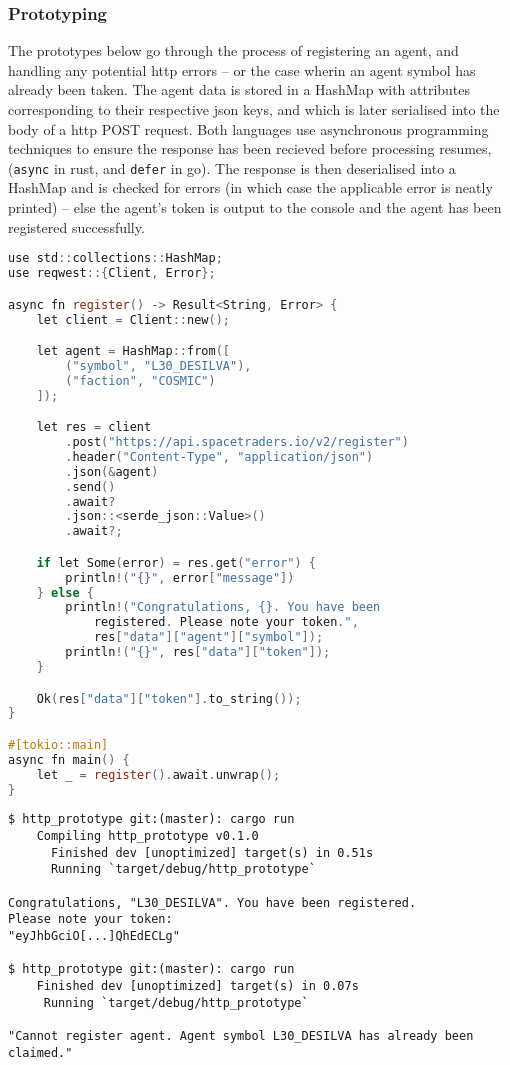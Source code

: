 \subsubsection{Prototyping}
The prototypes below go through the process of registering an agent, and handling any potential http errors – or the case wherin an agent symbol has already been taken. The agent data is stored in a HashMap with attributes corresponding to their respective json keys, and which is later serialised into the body of a http POST request. Both languages use asynchronous programming techniques to ensure the response has been recieved before processing resumes, (\texttt{async} in rust, and \texttt{defer} in go). The response is then deserialised into a HashMap and is checked for errors (in which case the applicable error is neatly printed) – else the agent's token is output to the console and the agent has been registered successfully.
\begin{lstlisting}[language=C]
use std::collections::HashMap;
use reqwest::{Client, Error};

async fn register() -> Result<String, Error> {
    let client = Client::new();

    let agent = HashMap::from([
        ("symbol", "L30_DESILVA"), 
        ("faction", "COSMIC")
    ]);

    let res = client
        .post("https://api.spacetraders.io/v2/register")
        .header("Content-Type", "application/json")
        .json(&agent)
        .send()
        .await?
        .json::<serde_json::Value>()
        .await?;

    if let Some(error) = res.get("error") {
        println!("{}", error["message"])
    } else {
        println!("Congratulations, {}. You have been 
            registered. Please note your token.", 
            res["data"]["agent"]["symbol"]);
        println!("{}", res["data"]["token"]);
    }

    Ok(res["data"]["token"].to_string());
}

#[tokio::main]
async fn main() {
    let _ = register().await.unwrap();
}

\end{lstlisting}

\begin{lstlisting}
$ http_prototype git:(master): cargo run
    Compiling http_prototype v0.1.0 
      Finished dev [unoptimized] target(s) in 0.51s
      Running `target/debug/http_prototype`

Congratulations, "L30_DESILVA". You have been registered.
Please note your token:
"eyJhbGciO[...]QhEdECLg"

$ http_prototype git:(master): cargo run
    Finished dev [unoptimized] target(s) in 0.07s
     Running `target/debug/http_prototype`

"Cannot register agent. Agent symbol L30_DESILVA has already been claimed." 

\end{lstlisting}

